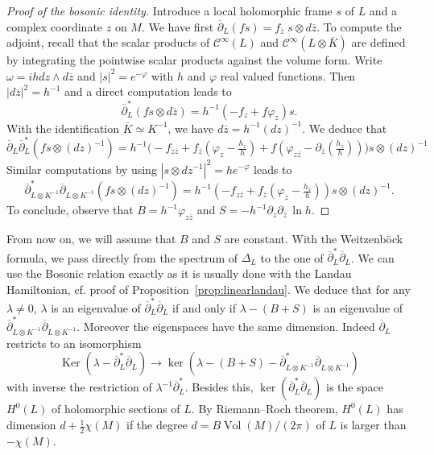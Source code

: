 \documentclass[10pt,a4paper]{article}
\theoremstyle{definition}
\numberwithin{equation}{section}
\newcommand{\la}{{\lambda}}
\newcommand{\om}{{\omega}}
\newcommand{\con}{\overline}
\newcommand{\op}{\operatorname}
\newcommand{\Ci}{{\mathcal{C}}^{\infty}}
\begin{document}
\begin{proof}[Proof of the bosonic identity]
Introduce a local holomorphic frame $s$ of $L$ and a complex coordinate $z$ on $M$. We have first $\con{\partial}_L (f s) = f_{\con{z}} \; s \otimes d \con{z}$. To compute the adjoint, recall that the scalar products of $\Ci (L)$ and $\Ci(L \otimes \con{K})$ are defined by integrating the pointwise scalar products against the volume form. Write $\om = i h dz \wedge d \con{z}$ and $|s|^2 = e^{-
\varphi}$ with $h$ and $\varphi$ real valued functions. Then $|d \con z |^2 = h^{-1}$ and a direct computation leads to
\[
\con{\partial}_L^* (f s \otimes d\con{z}) = h^{-1} (-
f_z + f \varphi_z) s.
\]
With the identification $\con{K} \simeq K^{-1}$, we have $ d\con{z} = h^{-1} (dz)^{-1}$. We deduce that
\[
\con{\partial}_L \con {\partial}_L^* \left(f s \otimes (dz)^{-1}\right) = h^{-1} \Big(-
f_{z \con{z} } + f_{\con{z}} \left(\varphi_z - \tfrac{h_z}{h}\right) + f \left(\varphi_{z
\con{z}} - \partial_{\con{z}} \left(\tfrac{h_z}{h}\right)\right) \Big) s \otimes (dz)^{-1}
\]
Similar computations by using $|s \otimes dz^{-1} |^2 = h e^{-\varphi}$ leads to
\[
\con{\partial}_{L\otimes
K^{-1}} ^* \con{\partial}_{L\otimes K^{-1}} \left(f s \otimes (dz)^{-1}\right) = h^{-1} \left(- f_{z \con{z}} +
f_{\con{z}} \left(\varphi_z - \tfrac{h_z}{h}\right) \right) s \otimes (dz)^{-1}.
\]
To conclude, observe that $B = h^{-1} \varphi_{z \con z}$ and $S = - h^{-1}
\partial_z \partial_{\con z} \, \ln h $.
\end{proof}

From now on, we will assume that $B$ and $S$ are constant. With the Weitzenb\"ock formula, we pass directly from the spectrum of $\Delta _L$ to the one of $\con{\partial}^*_L \con{\partial}_L$. We can use the Bosonic relation exactly as it is usually done with the Landau Hamiltonian, cf. proof of Proposition~\ref{prop:linearlandau}. We deduce that for any $\la \neq 0$, $\la $ is an eigenvalue of $\con{\partial}^*_L
\con{\partial}_L$ if and only if $\la - (B+S)$ is an eigenvalue of $\con{\partial}^*_{L\otimes K^{-1}} \con{\partial}_{L\otimes K^{-1}}$. Moreover the eigenspaces have the same dimension. Indeed $\con{\partial}_L$ restricts to an isomorphism
\[
\op{Ker} \left(\la - \con{\partial}^*_L
\con{\partial}_L\right) \rightarrow \op{ker} \left(\la - (B+S) -
\con{\partial}^*_{L\otimes K^{-1}} \con{\partial}_{L\otimes K^{-1}}\right)
\]
with inverse the restriction of $\la^{-1} \con {\partial}_L^*$. Besides this, $\ker (\con{\partial}^*_L
\con{\partial}_L)$ is the space $H^0 (L)$ of holomorphic sections of $L$. By Riemann--Roch theorem, $H^0 (L)$ has dimension $d + \frac{1}{2} \chi (M)$ if the degree $d = B \op{Vol}(M)/(2\pi)$ of $L$ is larger than $- \chi (M)$.
\end{document}
